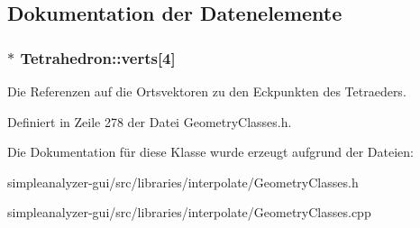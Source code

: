 \subsection{Dokumentation der Datenelemente}
\hypertarget{classTetrahedron_a4bb7ad83965859998a622b35a97ad935}{
\subsubsection[{verts}]{$\ast$ Tetrahedron\-::verts\mbox{[}4\mbox{]}\hspace{0.3cm}{\ttfamily [private]}}}\label{classTetrahedron_a4bb7ad83965859998a622b35a97ad935}
Die Referenzen auf die Ortsvektoren zu den Eckpunkten des Tetraeders. 

Definiert in Zeile 278 der Datei Geometry\-Classes.\-h.



Die Dokumentation für diese Klasse wurde erzeugt aufgrund der Dateien\-:\begin{DoxyCompactItemize}
\item 
simpleanalyzer-\/gui/src/libraries/interpolate/Geometry\-Classes.\-h\item 
simpleanalyzer-\/gui/src/libraries/interpolate/Geometry\-Classes.\-cpp\end{DoxyCompactItemize}
